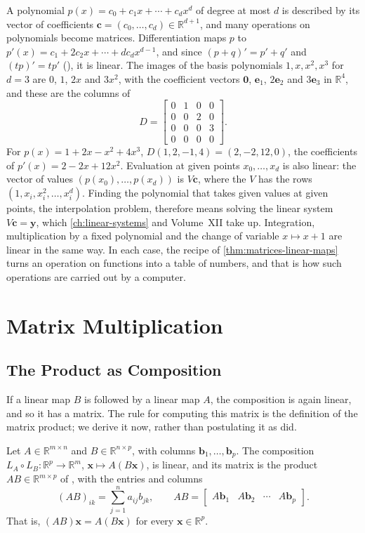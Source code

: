 A polynomial $p(x)=c_0+c_1x+\cdots+c_dx^d$ of degree at most $d$ is described by its vector of coefficients $\mathbf c=(c_0,\ldots,c_d)\in\mathbb R^{d+1}$, and many operations on polynomials become matrices. Differentiation maps $p$ to $p'(x)=c_1+2c_2x+\cdots+dc_dx^{d-1}$, and since $(p+q)'=p'+q'$ and $(tp)'=tp'$ (), it is linear. The images of the basis polynomials $1,x,x^2,x^3$ for $d=3$ are $0$, $1$, $2x$ and $3x^2$, with the coefficient vectors $\mathbf 0$, $\mathbf e_1$, $2\mathbf e_2$ and $3\mathbf e_3$ in $\mathbb R^4$, and these are the columns of
\[
D=\begin{bmatrix}0&1&0&0\\0&0&2&0\\0&0&0&3\\0&0&0&0\end{bmatrix}.
\]
For $p(x)=1+2x-x^2+4x^3$, $D(1,2,-1,4)=(2,-2,12,0)$, the coefficients of $p'(x)=2-2x+12x^2$. Evaluation at given points $x_0,\ldots,x_d$ is also linear: the vector of values $(p(x_0),\ldots,p(x_d))$ is $V\mathbf c$, where the  $V$ has the rows $(1,x_i,x_i^2,\ldots,x_i^d)$. Finding the polynomial that takes given values at given points, the interpolation problem, therefore means solving the linear system $V\mathbf c=\mathbf y$, which \cref{ch:linear-systems} and Volume~XII take up. Integration, multiplication by a fixed polynomial and the change of variable $x\mapsto x+1$ are linear in the same way. In each case, the recipe of \cref{thm:matrices-linear-maps} turns an operation on functions into a table of numbers, and that is how such operations are carried out by a computer.

\section{Matrix Multiplication}
\label{sec:matrix-multiplication}

\subsection{The Product as Composition}

If a linear map $B$ is followed by a linear map $A$, the composition is again linear, and so it has a matrix. The rule for computing this matrix is the definition of the matrix product; we derive it now, rather than postulating it as  did.

\begin{theorem}
\label{thm:product-composition}
Let $A\in\mathbb R^{m\times n}$ and $B\in\mathbb R^{n\times p}$, with columns $\mathbf b_1,\ldots,\mathbf b_p$. The composition $L_A\circ L_B\colon\mathbb R^p\to\mathbb R^m$, $\mathbf x\mapsto A(B\mathbf x)$, is linear, and its matrix is the product $AB\in\mathbb R^{m\times p}$ of , with the entries and columns
\[
(AB)_{ik}=\sum_{j=1}^na_{ij}b_{jk},\qquad AB=\begin{bmatrix}A\mathbf b_1&A\mathbf b_2&\cdots&A\mathbf b_p\end{bmatrix}.
\]
That is, $(AB)\mathbf x=A(B\mathbf x)$ for every $\mathbf x\in\mathbb R^p$.
\end{theorem}

